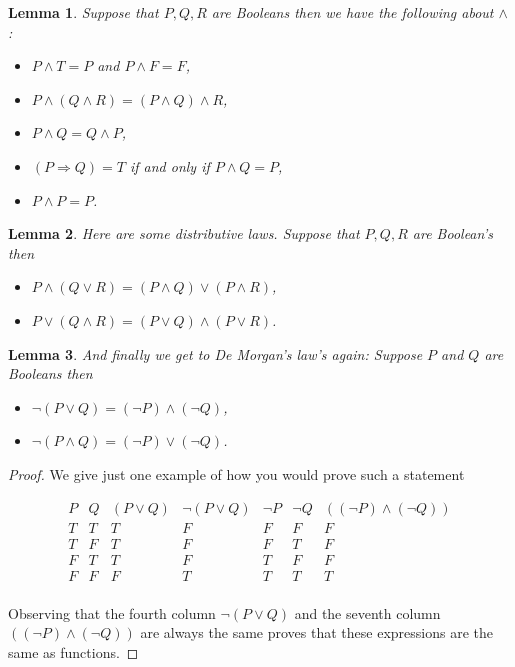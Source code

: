 \documentclass[
]{book}
\newtheorem{lemma}{Lemma}[chapter]
\theoremstyle{definition}
\theoremstyle{definition}
\theoremstyle{definition}
\theoremstyle{definition}
\theoremstyle{remark}
\begin{document}
\begin{lemma}

Suppose that \(P, Q, R\) are Booleans then we have the following about \(\wedge\):

\begin{itemize}
\item
  \(P \wedge T = P\) and \(P \wedge F = F\),
\item
  \(P \wedge (Q \wedge R)= (P\wedge Q) \wedge R\),
\item
  \(P \wedge Q = Q \wedge P\),
\item
  \((P \Rightarrow Q)= T\) if and only if \(P \wedge Q = P\),
\item
  \(P \wedge P = P\).
\end{itemize}

\end{lemma}

\begin{lemma}

Here are some distributive laws. Suppose that \(P, Q, R\) are Boolean's then

\begin{itemize}
\item
  \(P \wedge (Q \vee R) = (P \wedge Q) \vee (P \wedge R)\),
\item
  \(P \vee (Q \wedge R) = (P \vee Q) \wedge (P \vee R)\).
\end{itemize}

\end{lemma}

\begin{lemma}

And finally we get to De Morgan's law's again:
Suppose \(P\) and \(Q\) are Booleans then

\begin{itemize}
\item
  \(\neg (P \vee Q) = (\neg P) \wedge (\neg Q)\),
\item
  \(\neg (P \wedge Q) = (\neg P) \vee (\neg Q)\).
\end{itemize}

\end{lemma}

\begin{proof}
We give just one example of how you would prove such a statement

\begin{equation*}
\begin{array}{cc|ccccc}
P & Q & (P \vee Q) & \neg (P \vee Q) & \neg P & \neg Q & ((\neg P) \wedge (\neg Q)) \\
\hline
T & T & T & F & F & F & F\\
T & F & T & F & F & T & F\\
F & T & T & F & T & F & F\\
F & F & F & T & T & T & T \\
\end{array}
\end{equation*}

Observing that the fourth column \(\neg (P \vee Q)\) and the seventh column \(((\neg P) \wedge (\neg Q))\) are always the same proves that these expressions are the same as functions.
\end{proof}
\end{document}
